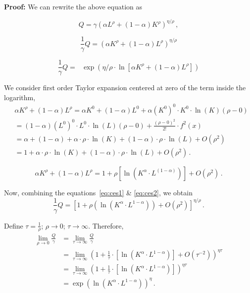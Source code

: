 \documentclass{article}
\begin{document}
\textbf{Proof:} We can rewrite the above equation as

\begin{equation*}          
Q=\gamma\left(\alpha{L}^\rho+(1-\alpha)K^\rho\right)^{\eta/\rho}\,,
\end{equation*}

\begin{equation}          
\frac{1}{\gamma} Q =\left(\alpha{K}^\rho+(1-\alpha)L^\rho\right)^{\eta/\rho}
\label{eq:ces1}
\end{equation}

\begin{equation}          
\frac{1}{\gamma} Q 
= \text{ } \exp{\left(\eta/\rho \cdot  \ln{\left[\alpha{K}^\rho+(1-\alpha)L^\rho\right]}\right)}
\end{equation}

We consider first order Taylor expansion centered at zero of the term inside the logarithm,
\begin{equation*}
\begin{split}
&\alpha{K}^\rho+(1-\alpha)L^\rho = \alpha K^{0} + (1-\alpha)L^{0} + \alpha \left(K^{0}\right)^{0} \cdot K^{0} \cdot \ln(K) (\rho -0)  \\
& = (1-\alpha) \left(L^{0}\right)^{0} \cdot L^{0} \cdot 
\ln(L) (\rho -0) + \frac{(\rho -0)^{2}}{2!} \cdot f^{2}(x)\\ 
&= \alpha + (1-\alpha) +\alpha \cdot \rho \cdot \ln(K) + (1-\alpha) \cdot \rho \cdot \ln(L) + O(\rho^{2})\\
&= 1 + \alpha \cdot \rho \cdot \ln(K) + (1-\alpha) \cdot \rho \cdot \ln(L) + O(\rho^{2})\,.
\end{split}
\end{equation*}

\begin{equation}
 \alpha{K}^\rho+(1-\alpha)L^\rho =  1 + \rho\left[\ln\left(K^{\alpha}\cdot L^{(1-\alpha)}\right)\right] + O(\rho^{2})  \,.
\label{eq:ces2}
\end{equation}

Now, combining the equations~\ref{eq:ces1} \& \ref{eq:ces2}, we obtain 
\begin{equation*}
\frac{1}{\gamma} Q = \left[1 + \rho\left(\ln\left(K^{\alpha}\cdot L^{1-\alpha}\right)\right) + O\left(\rho^{2}\right)\right]^{\eta/\rho}\,.
\end{equation*}

Define  
$\tau = \frac{1}{\rho}$;  $\rho \longrightarrow 0$; $\tau \longrightarrow \infty $. Therefore, 
\begin{equation*}
\begin{split}
\lim_{\rho\to 0} \frac{Q}{\gamma} &= \lim_{\tau\to\infty}\frac{Q}{\gamma}\\
&= \lim_{\tau\to\infty}\left(1+\frac{1}{\tau}\cdot\left[\ln(K^{\alpha} \cdot L^{1-\alpha})\right] + O\left(\tau^{-2}\right)\right)^{\eta \tau}\\
&= \lim_{\tau\to\infty}\left(1+\frac{1}{\tau}\cdot\left[\ln(K^{\alpha} \cdot L^{1-\alpha})\right]\right)^{\eta \tau}\\
&= \exp\left(\ln(K^{\alpha}\cdot L^{1-\alpha})\right)^{\eta}\,.
\end{split}
\end{equation*}
\end{document}
